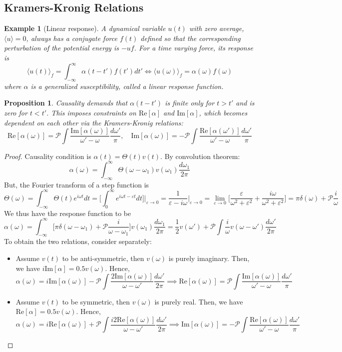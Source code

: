 \documentclass[a4paper]{article}
\newtheorem{eg}{Example}[section]
\theoremstyle{new}
\newtheorem{prop}{Proposition}[section]
\begin{document}
\subsection{Kramers-Kronig Relations}
\begin{eg}[Linear response]
A dynamical variable $u(t)$ with zero average, $\langle u\rangle = 0$, always has a conjugate force $f(t)$ defined so that the corresponding perturbation of the potential energy is $−uf$. For a time varying force, its response is
$$\langle u(t)\rangle_f=\int_{-\infty}^\infty\alpha(t-t')f(t')dt'\iff\langle u(\omega)\rangle_f=\alpha(\omega)f(\omega)$$
where $\alpha$ is a generalized susceptibility, called a linear response function.
\end{eg}
\begin{prop}
Causality demands that $\alpha(t-t')$ is finite only for $t>t'$ and is zero for $t<t'$. This imposes constraints on $\text{Re}[\alpha]$ and $\text{Im}[\alpha]$, which becomes dependent on each other via the Kramers-Kronig relations:
$$\text{Re}[\alpha(\omega)]=\mathcal{P}\int\frac{\text{Im}[\alpha(\omega)]}{\omega'-\omega}\frac{d\omega'}{\pi},\quad\text{Im}[\alpha(\omega)]=-\mathcal{P}\int\frac{\text{Re}[\alpha(\omega')]}{\omega'-\omega}\frac{d\omega'}{\pi}$$
\end{prop}
\begin{proof}
Causality condition is $\alpha(t)=\Theta(t)v(t)$. By convolution theorem:
$$\alpha(\omega)=\int_{-\infty}^\infty\Theta(\omega-\omega_1)v(\omega_1)\frac{d\omega_1}{2\pi}$$
But, the Fourier transform of a step function is
$$\Theta(\omega)=\int_{-\infty}^\infty\Theta(t)e^{i\omega t}dt=\bigg[\int_0^\infty e^{i\omega t-\varepsilon t}dt\bigg]\bigg|_{\varepsilon\rightarrow 0}=\frac{1}{\varepsilon-i\omega}\bigg|_{\varepsilon\rightarrow 0}=\lim_{\varepsilon\rightarrow 0}\bigg[\frac{\varepsilon}{\omega^2+\varepsilon^2}+\frac{i\omega}{\omega^2+\varepsilon^2}\bigg]=\pi\delta(\omega)+\mathcal{P}\frac{i}{\omega}$$
We thus have the response function to be
$$\alpha(\omega)=\int_{-\infty}^\infty\bigg[\pi\delta(\omega-\omega_1)+\mathcal{P}\frac{i}{\omega-\omega_1}\bigg]v(\omega_1)\frac{d\omega_1}{2\pi}=\frac{1}{2}v(\omega')+\mathcal{P}\int\frac{i}{\omega}v(\omega-\omega')\frac{d\omega'}{2\pi}$$
To obtain the two relations, consider separately:
\begin{itemize}
    \item Assume $v(t)$ to be anti-symmetric, then $v(\omega)$ is purely imaginary. Then, we have $i\text{Im}[\alpha]=0.5v(\omega)$. Hence,
    $$\alpha(\omega)=i\text{Im}[\alpha(\omega)]-\mathcal{P}\int\frac{2\text{Im}[\alpha(\omega)]}{\omega-\omega'}\frac{d\omega'}{2\pi}\implies\text{Re}[\alpha(\omega)]=\mathcal{P}\int\frac{\text{Im}[\alpha(\omega)]}{\omega'-\omega}\frac{d\omega'}{\pi}$$
    \item Assume $v(t)$ to be symmetric, then $v(\omega)$ is purely real. Then, we have $\text{Re}[\alpha]=0.5v(\omega)$. Hence,
    $$\alpha(\omega)=i\text{Re}[\alpha(\omega)]+\mathcal{P}\int\frac{i2\text{Re}[\alpha(\omega)]}{\omega-\omega'}\frac{d\omega'}{2\pi}\implies\text{Im}[\alpha(\omega)]=-\mathcal{P}\int\frac{\text{Re}[\alpha(\omega)]}{\omega'-\omega}\frac{d\omega'}{\pi}$$
\end{itemize}
\end{proof}
\end{document}
